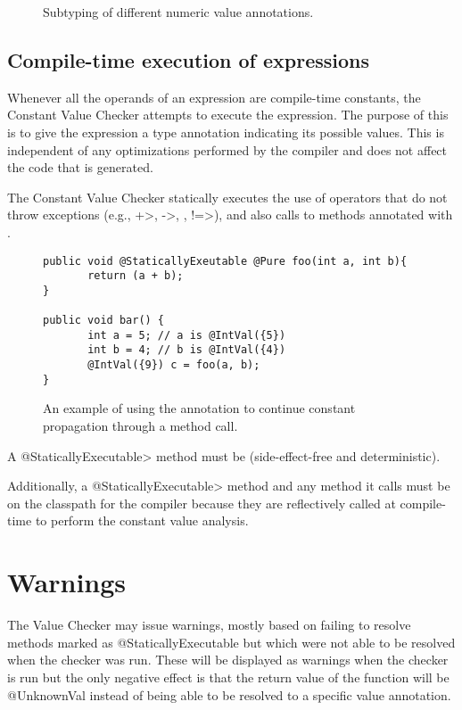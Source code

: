 \begin{figure}
\caption{Subtyping of different numeric value annotations.}
\label{fig-value-subtyping}
\end{figure}

\subsection{Compile-time execution of expressions\label{staticallyexecutable-annotation}}

Whenever all the operands of an expression are compile-time constants, the
Constant Value Checker attempts to execute the expression.  The purpose of
this is to give the expression a type annotation indicating its possible
values.  This is independent of any optimizations performed by the compiler
and does not affect the code that is generated.

The Constant Value Checker statically executes the use of operators that do
not throw exceptions (e.g., \<+>, \<->, \code{<\relax<}, \<!=>), and also
calls to methods annotated with
.

\begin{figure}
\begin{Verbatim}
public void @StaticallyExeutable @Pure foo(int a, int b){
       return (a + b);
}

public void bar() {
       int a = 5; // a is @IntVal({5})
       int b = 4; // b is @IntVal({4})
       @IntVal({9}) c = foo(a, b); 
}
\end{Verbatim}
\caption{An example of using the
   annotation to
  continue constant propagation through a method call.}
\label{fig-staticallyexecutable}
\end{figure}

A \<@StaticallyExecutable> method must
be  (side-effect-free and
deterministic).

Additionally, a \<@StaticallyExecutable> method and any method it calls must be on
the classpath for the compiler because they are reflectively called at
compile-time to perform the constant value analysis.


\section{Warnings\label{value-checker-warnings}}

The Value Checker may issue warnings, mostly based on failing to
resolve methods marked as @StaticallyExecutable but which were not able to be
resolved when the checker was run. These will be displayed as warnings when
the checker is run but the only negative effect is that the return
value of the function will be @UnknownVal instead of being able to be
resolved to a specific value annotation.


